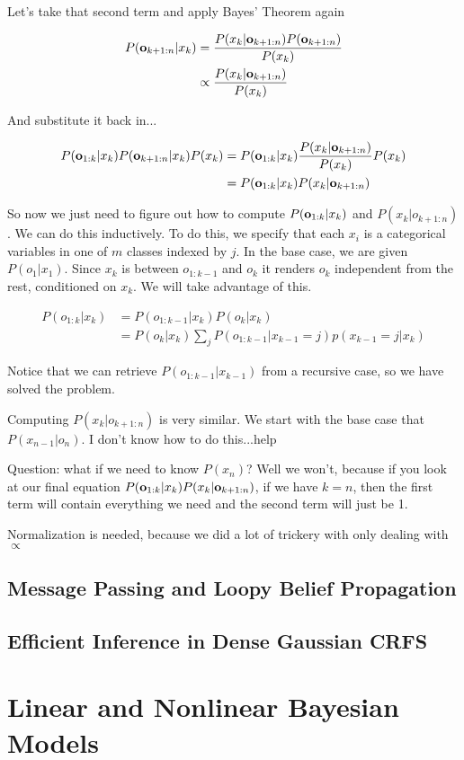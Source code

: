 \documentclass[12pt]{article}
\newcommand{\eq}[1]{\begin{align*}#1\end{align*}}
\begin{document}
Let's take that second term and apply Bayes' Theorem again

\eq{
  P(\o_{k+1:n}|x_k) &= \frac{P(x_k | \o_{k+1:n}) P(\o_{k+1:n})}{P(x_k)} \\
  &\propto \frac{P(x_k | \o_{k+1:n})}{P(x_k)}
}

And substitute it back in...

\eq{
  P(\o_{1:k}|x_k)P(\o_{k+1:n}|x_k)P(x_k) &= P(\o_{1:k}|x_k)\frac{P(x_k | \o_{k+1:n})}{P(x_k)}P(x_k)\\
  &= P(\o_{1:k}|x_k)P(x_k | \o_{k+1:n})
}

So now we just need to figure out how to compute $P(\mathbf{o}_{1:k}|x_k)$ and $P(x_k|o_{k+1:n})$. We can do this inductively. To do this, we specify that each $x_i$ is a categorical variables in one of $m$ classes indexed by $j$. In the base case, we are given $P(o_1 | x_1)$. Since $x_k$ is between $o_{1:k-1}$ and $o_k$ it renders $o_k$ independent from the rest, conditioned on $x_k$. We will take advantage of this.

\eq{
  P(o_{1:k}|x_k) &= P(o_{1:k-1}|x_k)P(o_k|x_k) \\
  & = P(o_k|x_k) \sum_j P(o_{1:k-1}|x_{k-1} = j)p(x_{k-1} = j|x_k)
}

Notice that we can retrieve $P(o_{1:k-1}|x_{k-1})$ from a recursive case, so we have solved the problem.

Computing $P(x_k|o_{k+1:n})$ is very similar. We start with the base case that $P(x_{n-1}|o_n)$. I don't know how to do this...help

Question: what if we need to know $P(x_n)$? Well we won't, because if you look at our final equation $P(\mathbf{o}_{1:k}|x_k)P(x_k | \mathbf{o}_{k+1:n})$, if we have $k = n$, then the first term will contain everything we need and the second term will just be 1. 

Normalization is needed, because we did a lot of trickery with only dealing with $\propto$

\subsection{Message Passing and Loopy Belief Propagation}

\subsection{Efficient Inference in Dense Gaussian CRFS}

\section{Linear and Nonlinear Bayesian Models}
\end{document}
